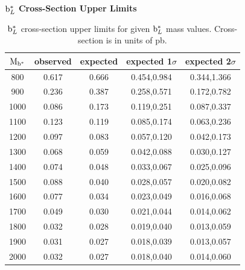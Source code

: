 \begin{table}[htcb]
\begin{center}
\bf{$\mathrm{b}^{*}_{L}$ Cross-Section Upper Limits}\\
\begin{tabular}{|c||c|c|c|c|}
\hline
\bf{$\mathrm{M_{\mathrm{b}^{*}}}$} & \bf{observed}  & \bf{expected} & \bf{expected 1$\sigma$}  & \bf{expected 2$\sigma$} \\
\hline
\hline
800 & 0.617 & 0.666 & 0.454,0.984 & 0.344,1.366\\ 
\hline
900 & 0.236 & 0.387 & 0.258,0.571 & 0.172,0.782\\ 
\hline
1000 & 0.086 & 0.173 & 0.119,0.251 & 0.087,0.337\\ 
\hline
1100 & 0.123 & 0.119 & 0.085,0.174 & 0.063,0.236\\ 
\hline
1200 & 0.097 & 0.083 & 0.057,0.120 & 0.042,0.173\\ 
\hline
1300 & 0.068 & 0.059 & 0.042,0.088 & 0.030,0.127\\ 
\hline
1400 & 0.074 & 0.048 & 0.033,0.067 & 0.025,0.096\\ 
\hline
1500 & 0.088 & 0.040 & 0.028,0.057 & 0.020,0.082\\
\hline
1600 & 0.077 & 0.034 & 0.023,0.049 & 0.016,0.068\\ 
\hline
1700 & 0.049 & 0.030 & 0.021,0.044 & 0.014,0.062\\ 
\hline
1800 & 0.032 & 0.028 & 0.019,0.040 & 0.013,0.059\\ 
\hline
1900 & 0.031 & 0.027 & 0.018,0.039 & 0.013,0.057\\ 
\hline
2000 & 0.032 & 0.027 & 0.018,0.040 & 0.014,0.060\\ 
\hline
\end{tabular}
\end{center}
\caption{$\mathrm{b}^{*}_L$ cross-section upper limits for given $\mathrm{b}^{*}_L$ mass values.  Cross-section is in units of pb.}
\label{table:bsupperxsecL}
\end{table}



